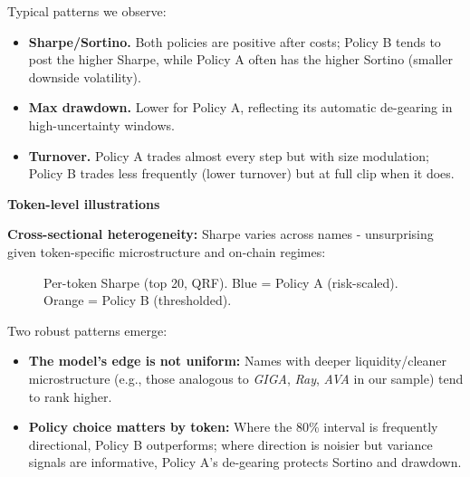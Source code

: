 \documentclass[
  a4paper,
  DIV=11,
  numbers=noendperiod]{scrreprt}
\providecommand{\tightlist}{%
  \setlength{\itemsep}{0pt}\setlength{\parskip}{0pt}}
\begin{document}
Typical patterns we observe:

\begin{itemize}
\tightlist
\item
  \textbf{Sharpe/Sortino.} Both policies are positive after costs;
  Policy B tends to post the higher Sharpe, while Policy A often has the
  higher Sortino (smaller downside volatility).
\item
  \textbf{Max drawdown.} Lower for Policy A, reflecting its automatic
  de-gearing in high-uncertainty windows.
\item
  \textbf{Turnover.} Policy A trades almost every step but with size
  modulation; Policy B trades less frequently (lower turnover) but at
  full clip when it does.
\end{itemize}

\textbf{Token-level illustrations}

\textbf{Cross-sectional heterogeneity:} Sharpe varies across names -
unsurprising given token-specific microstructure and on-chain regimes:

\begin{figure}


\caption{\label{fig-token-sharpe}Per-token Sharpe (top 20, QRF). Blue =
Policy A (risk-scaled). Orange = Policy B (thresholded).}

\end{figure}%

Two robust patterns emerge:

\begin{itemize}
\tightlist
\item
  \textbf{The model's edge is not uniform:} Names with deeper
  liquidity/cleaner microstructure (e.g., those analogous to
  \emph{GIGA}, \emph{Ray}, \emph{AVA} in our sample) tend to rank
  higher.
\item
  \textbf{Policy choice matters by token:} Where the 80\% interval is
  frequently directional, Policy B outperforms; where direction is
  noisier but variance signals are informative, Policy A's de-gearing
  protects Sortino and drawdown.
\end{itemize}
\end{document}

